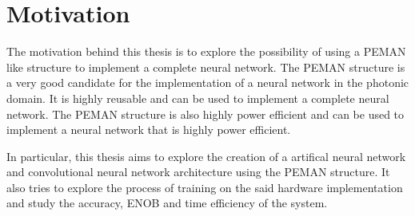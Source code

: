 \section{Motivation}

The motivation behind this thesis is to explore the possibility of using a PEMAN like structure to implement a complete neural network. The PEMAN structure is a very good candidate for the implementation of a neural network in the photonic domain. It is highly reusable and can be used to implement a complete neural network. The PEMAN structure is also highly power efficient and can be used to implement a neural network that is highly power efficient.

In particular, this thesis aims to explore the creation of a artifical neural network and convolutional neural network architecture using the PEMAN structure. It also tries to explore the process of training on the said hardware implementation and study the accuracy, ENOB and time efficiency of the system.

